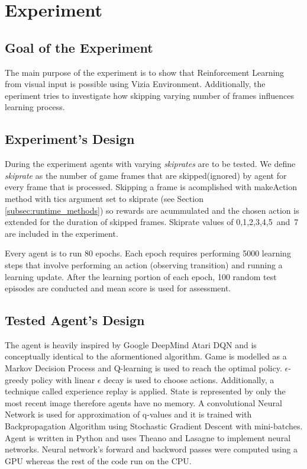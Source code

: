 \chapter{Experiment}\label{ch:experiment}

\section{Goal of the Experiment}
The main purpose of the experiment is to show that Reinforcement Learning from visual input is possible using Vizia Environment. 	
Additionally, the eperiment tries to investigate how skipping varying number of frames influences learning process.

\section{Experiment's Design}
During the experiment agents with varying \emph{skiprates} are to be tested. We define \emph{skiprate} as the number of game frames that are skipped(ignored) by agent for every frame that is processed. Skipping a frame is acomplished with makeAction method with tics argument set to skiprate (see Section \ref{subsec:runtime_methods}) so rewards are acummulated and the chosen action is extended for the duration of skipped frames. Skiprate values of 0,1,2,3,4,5~and~7 are included in the experiment. 

Every agent is to run 80 epochs. Each epoch requires performing 5000 learning steps that involve performing an action (observing transition) and running a learning update. After the learning portion of each epoch, 100 random test episodes are conducted and mean score is used for assessment.  

\section{Tested Agent's Design}
	The agent is heavily inspired by Google DeepMind Atari DQN \cite{mnih-dqn-2015}\cite{mnih-atari-2013} and is conceptually identical to the aformentioned algorithm. Game is modelled as a Markov Decision Process and Q-learning\cite{watkins:mlj92} is used to reach the optimal policy. $\epsilon$-greedy policy with linear $\epsilon$ decay is used to choose actions. Additionally, a technique called experience replay\cite{mnih-dqn-2015} is applied. State is represented by only the most recent image therefore agents have no memory. A convolutional Neural Network is used for approximation of q-values and it is trained with Backpropagation Algorithm\cite{lecun-98b} using Stochastic Gradient Descent with mini-batches. Agent is written in Python and uses Theano\cite{Bastien-Theano-2012}\cite{bergstra+al:2010-scipy} and Lasagne\cite{sander_dieleman_2015_27878} to implement neural networks. Neural network's forward and backword passes were computed using a GPU whereas the rest of the code run on the CPU.

